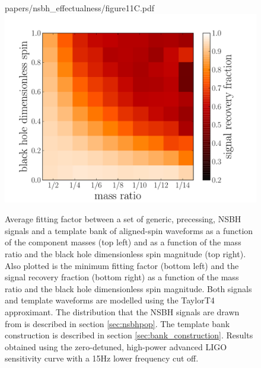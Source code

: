 \begin{figure}
\begin{minipage}[l]{\columnwidth}
{papers/nsbh_effectualness/figure11C.pdf}
\includegraphics[width=1.0\textwidth]
{papers/nsbh_effectualness/figure11D.pdf}
\caption{\label{fig:aspinavFF}
Average fitting factor between a set of generic, precessing, NSBH
signals and a template bank of aligned-spin waveforms as a function of the
component masses (top left) and as a function of the
mass ratio and the black hole dimensionless spin
magnitude (top right). Also plotted is the minimum fitting factor (bottom left) 
and the signal recovery fraction (bottom right) as a function of the
mass ratio and the black hole dimensionless spin magnitude. Both signals and
template waveforms are modelled using the TaylorT4 approximant.
The distribution that the NSBH signals are drawn from
is described in section \ref{sec:nsbhpop}. The template bank construction
is described in section \ref{sec:bank_construction}. Results obtained
using the zero-detuned, high-power advanced LIGO sensitivity curve with a 15Hz
lower frequency cut off.
}
\end{minipage}
\end{figure}

